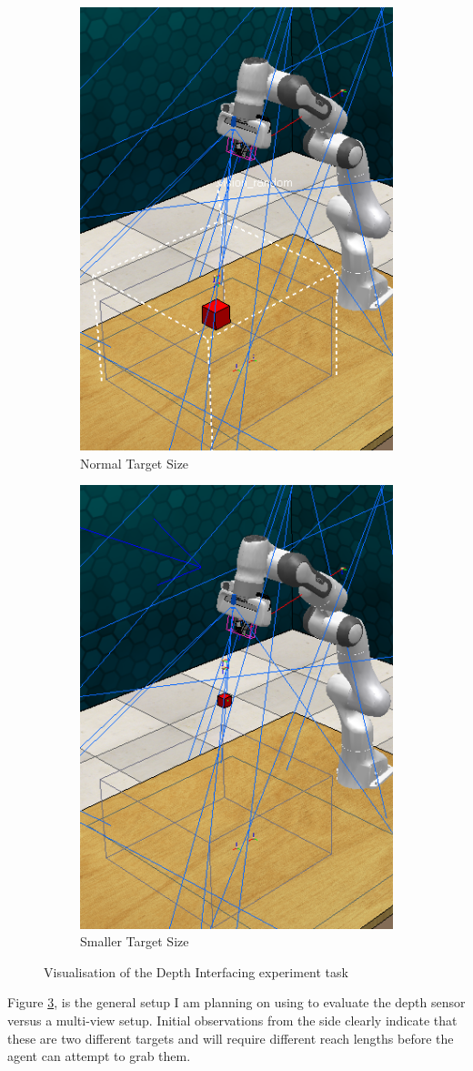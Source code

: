 \begin{figure}[htpb] %
  \centering
  \begin{subfigure}{0.4\linewidth}
    \centering
    \includegraphics[width=0.3\linewidth]{assets/depth-interfacing/normal-size-grasp.png}
    \caption{Normal Target Size}\label{subfig:normal-grasp}
  \end{subfigure}
  \begin{subfigure}{0.4\linewidth}
    \centering
    \includegraphics[width=0.3\linewidth]{assets/depth-interfacing/smaller-grasp.png}
    \caption{Smaller Target Size}\label{subfig:small-grasp}
  \end{subfigure}
  \caption{Visualisation of the Depth Interfacing experiment task}\label{fig:di-task}
\end{figure}

Figure \ref{fig:di-task}, is the general setup I am planning on using to evaluate the depth sensor versus a multi-view setup. Initial observations from the side clearly indicate that these are two different targets and will require different reach lengths before the agent can attempt to grab them.

